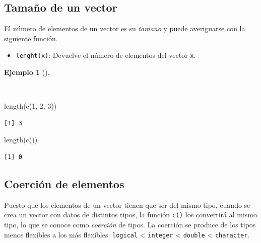 \documentclass[
  a4paper,
]{scrreport}
\newenvironment{Shaded}{\begin{snugshade}}{\end{snugshade}}
\newcommand{\DecValTok}[1]{\textcolor[rgb]{0.68,0.00,0.00}{#1}}
\newcommand{\FunctionTok}[1]{\textcolor[rgb]{0.28,0.35,0.67}{#1}}
\newcommand{\NormalTok}[1]{\textcolor[rgb]{0.00,0.23,0.31}{#1}}
\providecommand{\tightlist}{%
  \setlength{\itemsep}{0pt}\setlength{\parskip}{0pt}}\usepackage{longtable,booktabs,array}
\theoremstyle{definition}
\theoremstyle{definition}
\newtheorem{example}{Ejemplo}[chapter]
\theoremstyle{remark}
\begin{document}
\hypertarget{tamauxf1o-de-un-vector}{%
\subsection{Tamaño de un vector}\label{tamauxf1o-de-un-vector}}

El número de elementos de un vector es su \emph{tamaño} y puede
averiguarse con la siguiente función.

\begin{itemize}
\tightlist
\item
  \texttt{lenght(x)}: Devuelve el número de elementos del vector
  \texttt{x}.
\end{itemize}

\begin{example}[]\protect\hypertarget{exm-tamaño-vector}{}\label{exm-tamaño-vector}

~

\begin{Shaded}
\begin{Highlighting}[]
\FunctionTok{length}\NormalTok{(}\FunctionTok{c}\NormalTok{(}\DecValTok{1}\NormalTok{, }\DecValTok{2}\NormalTok{, }\DecValTok{3}\NormalTok{))}
\end{Highlighting}
\end{Shaded}

\begin{verbatim}
[1] 3
\end{verbatim}

\begin{Shaded}
\begin{Highlighting}[]
\FunctionTok{length}\NormalTok{(}\FunctionTok{c}\NormalTok{())}
\end{Highlighting}
\end{Shaded}

\begin{verbatim}
[1] 0
\end{verbatim}

\end{example}

\hypertarget{coerciuxf3n-de-elementos}{%
\subsection{Coerción de elementos}\label{coerciuxf3n-de-elementos}}

Puesto que los elementos de un vector tienen que ser del mismo tipo,
cuando se crea un vector con datos de distintos tipos, la función
\texttt{c()} los convertirá al mismo tipo, lo que se conoce como
\emph{coerción} de tipos. La coerción se produce de los tipos menos
flexibles a los más flexibles: \texttt{logical} \textless{}
\texttt{integer} \textless{} \texttt{double} \textless{}
\texttt{character}.
\end{document}
